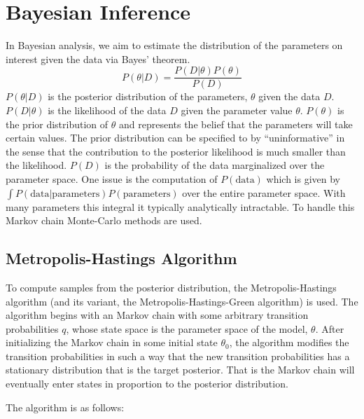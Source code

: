\documentclass[]{article}
\numberwithin{equation}{section}
\begin{document}
\hypertarget{bayesian-inference}{%
\section{Bayesian Inference}\label{bayesian-inference}}

In Bayesian analysis, we aim to estimate the distribution of the
parameters on interest given the data via Bayes' theorem.
\[ P(\theta|D) = \frac{P(D|\theta)P(\theta)}{P(D)} \] \(P(\theta|D)\) is
the posterior distribution of the parameters, \(\theta\) given the data
\(D\). \(P(D|\theta)\) is the likelihood of the data \(D\) given the
parameter value \(\theta\). \(P(\theta)\) is the prior distribution of
\(\theta\) and represents the belief that the parameters will take
certain values. The prior distribution can be specified to by
``uninformative'' in the sense that the contribution to the posterior
likelihood is much smaller than the likelihood. \(P(D)\) is the
probability of the data marginalized over the parameter space. One issue
is the computation of \(P(\text{data})\) which is given by
\(\int P(\text{data}|\text{parameters})P(\text{parameters})\) over the
entire parameter space. With many parameters this integral it typically
analytically intractable. To handle this Markov chain Monte-Carlo
methods are used.

\hypertarget{metropolis-hastings-algorithm}{%
\subsection{Metropolis-Hastings
Algorithm}\label{metropolis-hastings-algorithm}}

To compute samples from the posterior distribution, the
Metropolis-Hastings algorithm (and its variant, the
Metropolis-Hastings-Green algorithm) is used. The algorithm begins with
an Markov chain with some arbitrary transition probabilities \(q\),
whose state space is the parameter space of the model, \(\theta\). After
initializing the Markov chain in some initial state \(\theta_0\), the
algorithm modifies the transition probabilities in such a way that the
new transition probabilities has a stationary distribution that is the
target posterior. That is the Markov chain will eventually enter states
in proportion to the posterior distribution.

The algorithm is as follows:
\end{document}
